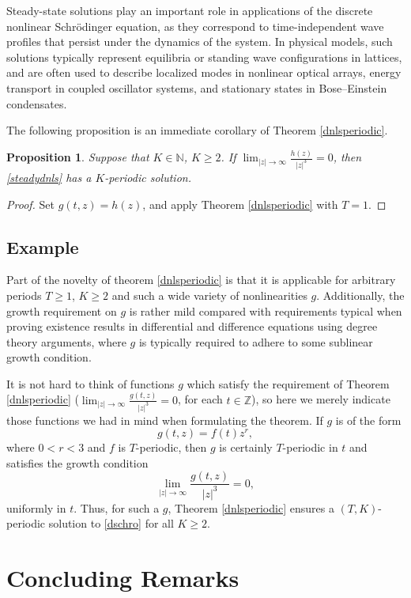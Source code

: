 \documentclass[12 pt,twoside]{amsart}
\newcommand{\N}{\mathbb{N}}
\newcommand{\Z}{\mathbb{Z}}
\newcommand{\bes}{\begin{equation*}}
\newcommand{\ees}{\end{equation*}}
\numberwithin{equation}{section}
\newtheorem{proposition}[theorem]{Proposition}
\theoremstyle{definition}
\theoremstyle{remark}
\begin{document}
Steady-state solutions play an important role in applications of the discrete nonlinear Schr\"odinger equation, as they correspond to time-independent wave profiles that persist under the dynamics of the system. In physical models, such solutions typically represent equilibria or standing wave configurations in lattices, and are often used to describe localized modes in nonlinear optical arrays, energy transport in coupled oscillator systems, and stationary states in Bose--Einstein condensates.


The following proposition is an immediate corollary of Theorem \ref{dnlsperiodic}. 
\begin{proposition}
Suppose that $K\in \N$, $K\geq 2$.  If $\lim_{|z|\to \infty} \frac{h(z)}{|z|^3}=0$, then \eqref{steadydnls} has a $K$-periodic solution.
\end{proposition}


\begin{proof}
Set $g(t,z)=h(z)$, and apply Theorem \ref{dnlsperiodic} with $T=1$.
 \end{proof}

\medskip

\subsection{Example}
Part of the novelty of theorem \ref{dnlsperiodic} is that it is applicable for arbitrary periods $T\geq 1$, $K\geq 2$ and such a wide variety of nonlinearities $g$.  Additionally, the growth requirement on $g$ is rather mild compared with requirements typical when proving existence results in differential and difference equations using degree theory arguments, where $g$ is typically required to adhere to some sublinear growth condition. 

 It is not hard to think of functions $g$ which satisfy the requirement of Theorem \ref{dnlsperiodic} ($\lim_{|z|\to \infty} \frac{g(t,z)}{|z|^3}=0$, for each $t\in \Z$), so here we merely indicate those functions we had in mind when formulating the theorem.  If $g$ is of the form
\bes
g(t,z) = f(t)z^r,
\ees
where $0<r<3$ and $f$ is $T$-periodic,
then $g$ is certainly $T$-periodic in $t$ and satisfies the growth condition
\bes
\lim_{|z|\to\infty} \frac{g(t,z)}{|z|^3} = 0,
\ees
uniformly in $t$.
Thus, for such a $g$, Theorem \ref{dnlsperiodic} ensures a $(T,K)$-periodic solution to \eqref{dschro} for all $K\geq 2$.

\section*{Concluding Remarks}
\end{document}
